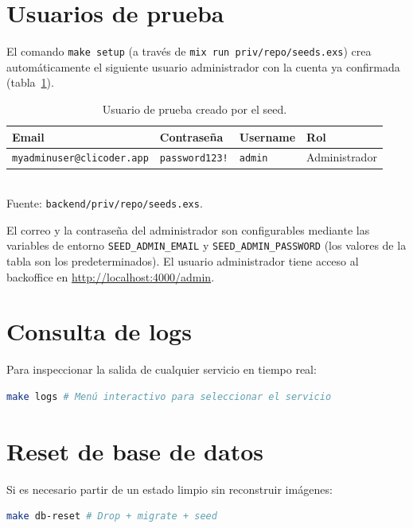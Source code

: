 \section{Usuarios de prueba}

El comando \texttt{make setup} (a través de \texttt{mix run priv/repo/seeds.exs}) crea automáticamente el siguiente usuario administrador con la cuenta ya confirmada (tabla~\ref{tab:seeds}).

\begin{table}[h]
\centering
\caption{Usuario de prueba creado por el seed.}
\label{tab:seeds}
\begin{tabular}{llll}
\hline
\textbf{Email} & \textbf{Contraseña} & \textbf{Username} & \textbf{Rol} \\
\hline
\texttt{myadminuser@clicoder.app} & \texttt{password123!} & \texttt{admin} & Administrador \\
\hline
\end{tabular}
\\[4pt]
{\footnotesize Fuente: \texttt{backend/\allowbreak{}priv/\allowbreak{}repo/\allowbreak{}seeds.exs}.}
\end{table}

El correo y la contraseña del administrador son configurables mediante las variables de entorno \texttt{SEED\_ADMIN\_EMAIL} y \texttt{SEED\_ADMIN\_PASSWORD} (los valores de la tabla son los predeterminados). El usuario administrador tiene acceso al backoffice en \url{http://localhost:4000/admin}.

\section{Consulta de logs}

Para inspeccionar la salida de cualquier servicio en tiempo real:

\begin{lstlisting}[language=bash]
make logs # Menú interactivo para seleccionar el servicio
\end{lstlisting}

\section{Reset de base de datos}

Si es necesario partir de un estado limpio sin reconstruir imágenes:

\begin{lstlisting}[language=bash]
make db-reset # Drop + migrate + seed
\end{lstlisting}

